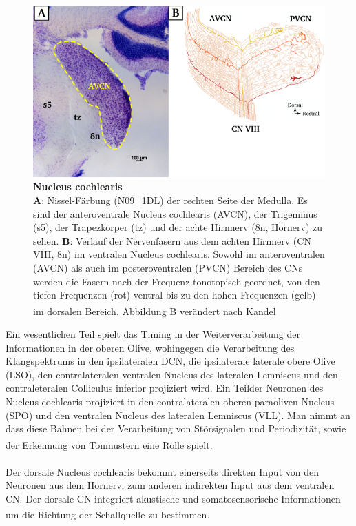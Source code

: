 \documentclass[12pt,a4paper,pdftex]{article}
\begin{document}
\begin{figure}[H]
    \centering
    \includegraphics[width = \textwidth]{pictures/auditory/CN.png}
    \caption[Nucleus cochlearis]{\textbf{Nucleus cochlearis}\\
    \textbf{A}: Nissel-Färbung (N09\_1DL) der rechten Seite der Medulla. Es sind der anteroventrale Nucleus cochlearis (AVCN), der Trigeminus (s5), der Trapezkörper (tz) und der achte Hirnnerv (8n, Hörnerv) zu sehen. \textbf{B}: Verlauf der Nervenfasern aus dem achten Hirnnerv (CN VIII, 8n) im ventralen Nucleus cochlearis. Sowohl im anteroventralen (AVCN) als auch im posteroventralen (PVCN) Bereich des CNs werden die Fasern nach der Frequenz tonotopisch geordnet, von den tiefen Frequenzen (rot) ventral bis zu den hohen Frequenzen (gelb) im dorsalen Bereich. Abbildung B verändert nach Kandel \textsuperscript{\cite[31]{kandel2013principles}}}
    \label{fig:Nucleus_cochlearis}
\end{figure}

\newpage
Ein wesentlichen Teil spielt das Timing in der Weiterverarbeitung der Informationen in der oberen Olive, wohingegen die Verarbeitung des Klangspektrums in den ipsilateralen DCN, die ipsilaterale laterale obere Olive (LSO), den contralateralen ventralen Nucleus des lateralen Lemniscus und den contraleteralen Colliculus inferior projiziert wird. Ein Teilder Neuronen des Nucleus cochlearis projiziert in den contralateralen oberen paraoliven Nucleus (SPO) und den ventralen Nucleus des lateralen Lemniscus (VLL). Man nimmt an dass diese Bahnen bei der Verarbeitung von Störsignalen und Periodizität, sowie der Erkennung von Tonmustern eine Rolle spielt\textsuperscript{\cite[31]{kandel2013principles}}.  
\\\\
\noindent Der dorsale Nucleus cochlearis bekommt einerseits direkten Input von den Neuronen aus dem Hörnerv, zum anderen indirekten Input aus dem ventralen CN. Der dorsale CN integriert akustische  und somatosensorische Informationen um die Richtung der Schallquelle zu bestimmen\textsuperscript{\cite[31]{kandel2013principles}}.
\end{document}
